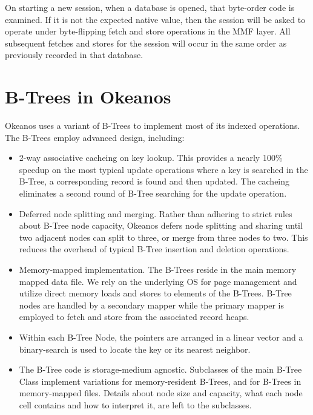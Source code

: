 \documentclass[article,oneside]{memoir}
\begin{document}
On starting a new session, when a database is opened, that byte-order code is examined. If it is not the expected native value, then the session will be asked to operate under byte-flipping fetch and store operations in the MMF layer. All subsequent fetches and stores for the session will occur in the same order as previously recorded in that database.

\section{B-Trees in Okeanos}
Okeanos uses a variant of B-Trees to implement most of its indexed operations. The B-Trees employ advanced design, including:

\begin{itemize}
\item 2-way associative cacheing on key lookup. This provides a nearly 100\% speedup on the most typical update operations where a key is searched in the B-Tree, a corresponding record is found and then updated. The cacheing eliminates a second round of B-Tree searching for the update operation.

\item Deferred node splitting and merging. Rather than adhering to strict rules about B-Tree node capacity, Okeanos defers node splitting and sharing until two adjacent nodes can split to three, or merge from three nodes to two. This reduces the overhead of typical B-Tree insertion and deletion operations.

\item Memory-mapped implementation. The B-Trees reside in the main memory mapped data file. We rely on the underlying OS for page management and utilize direct memory loads and stores to elements of the B-Trees. B-Tree nodes are handled by a secondary mapper while the primary mapper is employed to fetch and store from the associated record heaps.

\item Within each B-Tree Node, the pointers are arranged in a linear vector and a binary-search is used to locate the key or its nearest neighbor.

\item The B-Tree code is storage-medium agnostic. Subclasses of the main B-Tree Class implement variations for memory-resident B-Trees, and for B-Trees in memory-mapped files. Details about node size and capacity, what each node cell contains and how to interpret it, are left to the subclasses.
\end{itemize}
\end{document}

